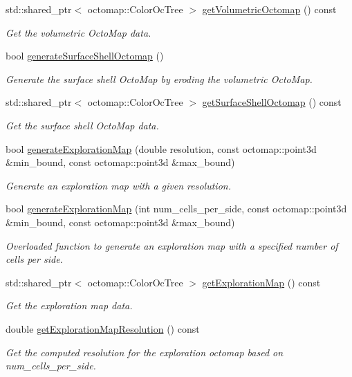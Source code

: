\begin{DoxyCompactItemize}
std\+::shared\+\_\+ptr$<$ octomap\+::\+Color\+Oc\+Tree $>$ \hyperlink{classvisioncraft_1_1ModelLoader_a8cf70f9736ed88dac4761fbd698a10c6}{get\+Volumetric\+Octomap} () const
\begin{DoxyCompactList}\small\item\em Get the volumetric Octo\+Map data. \end{DoxyCompactList}\item 
bool \hyperlink{classvisioncraft_1_1ModelLoader_a5ccc885b3c8871366bca80aef0134a11}{generate\+Surface\+Shell\+Octomap} ()
\begin{DoxyCompactList}\small\item\em Generate the surface shell Octo\+Map by eroding the volumetric Octo\+Map. \end{DoxyCompactList}\item 
std\+::shared\+\_\+ptr$<$ octomap\+::\+Color\+Oc\+Tree $>$ \hyperlink{classvisioncraft_1_1ModelLoader_ae6f4b53ca7b10ddfda1516120184da2f}{get\+Surface\+Shell\+Octomap} () const
\begin{DoxyCompactList}\small\item\em Get the surface shell Octo\+Map data. \end{DoxyCompactList}\item 
bool \hyperlink{classvisioncraft_1_1ModelLoader_a836161273c92de2284e0be6807517b4e}{generate\+Exploration\+Map} (double resolution, const octomap\+::point3d \&min\+\_\+bound, const octomap\+::point3d \&max\+\_\+bound)
\begin{DoxyCompactList}\small\item\em Generate an exploration map with a given resolution. \end{DoxyCompactList}\item 
bool \hyperlink{classvisioncraft_1_1ModelLoader_addf06bf0d81ec5380caa289a4e39b1d7}{generate\+Exploration\+Map} (int num\+\_\+cells\+\_\+per\+\_\+side, const octomap\+::point3d \&min\+\_\+bound, const octomap\+::point3d \&max\+\_\+bound)
\begin{DoxyCompactList}\small\item\em Overloaded function to generate an exploration map with a specified number of cells per side. \end{DoxyCompactList}\item 
std\+::shared\+\_\+ptr$<$ octomap\+::\+Color\+Oc\+Tree $>$ \hyperlink{classvisioncraft_1_1ModelLoader_a61eca982997a4ad7ecb829079149e066}{get\+Exploration\+Map} () const
\begin{DoxyCompactList}\small\item\em Get the exploration map data. \end{DoxyCompactList}\item 
double \hyperlink{classvisioncraft_1_1ModelLoader_a124c5b8cb8ef25534fce513fc225c9ec}{get\+Exploration\+Map\+Resolution} () const
\begin{DoxyCompactList}\small\item\em Get the computed resolution for the exploration octomap based on num\+\_\+cells\+\_\+per\+\_\+side. \end{DoxyCompactList}\end{DoxyCompactItemize}


